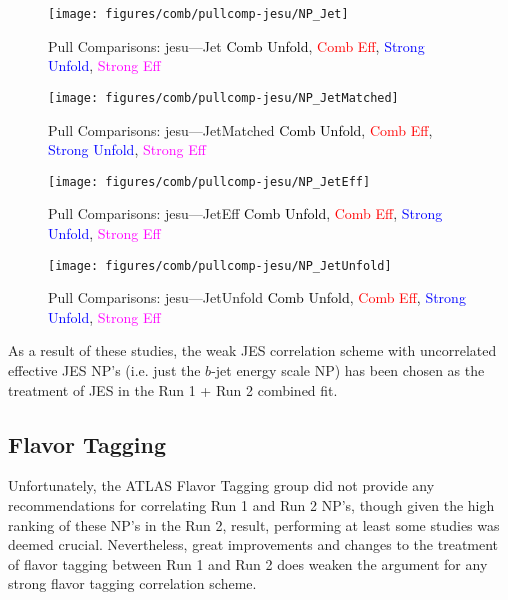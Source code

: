 \begin{figure}[!htbp]\captionsetup{justification=centering}
\centering
\texttt{[image: figures/comb/pullcomp-jesu/NP\_Jet]}
  \caption{Pull Comparisons: jesu---Jet  \textcolor{black}{Comb Unfold}, \textcolor{red}{Comb Eff}, \textcolor{blue}{Strong Unfold}, \textcolor{magenta}{Strong Eff}}
  \label{fig:PullComparisons:jesu---Jet}  
\end{figure}

\begin{figure}[!htbp]\captionsetup{justification=centering}
\centering
\texttt{[image: figures/comb/pullcomp-jesu/NP\_JetMatched]}
  \caption{Pull Comparisons: jesu---JetMatched  \textcolor{black}{Comb Unfold}, \textcolor{red}{Comb Eff}, \textcolor{blue}{Strong Unfold}, \textcolor{magenta}{Strong Eff}}
  \label{fig:PullComparisons:jesu---JetMatched}
\end{figure}

\begin{figure}[!htbp]\captionsetup{justification=centering}
\centering
\texttt{[image: figures/comb/pullcomp-jesu/NP\_JetEff]}
  \caption{Pull Comparisons: jesu---JetEff  \textcolor{black}{Comb Unfold}, \textcolor{red}{Comb Eff}, \textcolor{blue}{Strong Unfold}, \textcolor{magenta}{Strong Eff}}
  \label{fig:PullComparisons:jesu---JetEff}
\end{figure}

\begin{figure}[!htbp]\captionsetup{justification=centering}
\centering
\texttt{[image: figures/comb/pullcomp-jesu/NP\_JetUnfold]}
  \caption{Pull Comparisons: jesu---JetUnfold  \textcolor{black}{Comb Unfold}, \textcolor{red}{Comb Eff}, \textcolor{blue}{Strong Unfold}, \textcolor{magenta}{Strong Eff}}
  \label{fig:PullComparisons:jesu---JetUnfold}
\end{figure}

As a result of these studies, the weak JES correlation scheme with uncorrelated effective JES NP's (i.e. just the $b$-jet energy scale NP) has been chosen as the treatment of JES in the Run 1 + Run 2 combined fit.

\clearpage
\subsection{Flavor Tagging}
\label{sec:ft}
Unfortunately, the ATLAS Flavor Tagging group did not provide any recommendations for correlating Run 1 and Run 2 NP's, though given the high ranking of these NP's in the Run 2, result, performing at least some studies was deemed crucial.  Nevertheless, great improvements and changes to the treatment of flavor tagging between Run 1 and Run 2 does weaken the argument for any strong flavor tagging correlation scheme.

